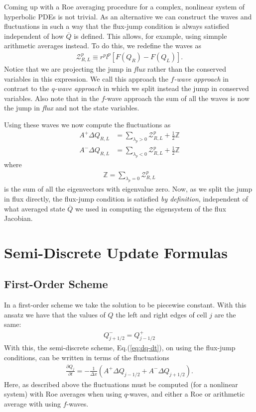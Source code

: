 \documentclass[12pt]{article}
\theoremstyle{definition}
\theoremstyle{definition}
\theoremstyle{definition}
\newcommand{\eqr}[1]{Eq.\thinspace(#1)}
\newcommand{\pfrac}[2]{\frac{\partial #1}{\partial #2}}
\begin{document}
Coming up with a Roe averaging procedure for a complex, nonlinear
system of hyperbolic PDEs is not trivial. As an alternative we can
construct the waves and fluctuations in such a way that the flux-jump
condition is always satisfied independent of how $\overline{Q}$ is
defined. This allows, for example, using simnple arithmetic averages
instead. To do this, we redefine the waves as
\begin{align}
  \mathcal{Z}^p_{R,L} \equiv r^p l^p\left[ F(Q_R) -F(Q_L) \right].
\end{align}
Notice that we are projecting the jump in \emph{flux} rather than the
conserved variables in this expression. We call this approach the
\emph{$f$-wave approach} in contrast to the \emph{$q$-wave approach}
in which we split instead the jump in conserved variables. Also note
that in the $f$-wave approach the sum of all the waves is now the jump
in \emph{flux} and not the state variables.

Using these waves we now compute the fluctuations as
\begin{align}
  A^+\Delta Q_{R,L} &= \sum_{\lambda_p>0} \mathcal{Z}_{R,L}^p + \frac{1}{2} \mathbb{Z} \\
  A^-\Delta Q_{R,L} &= \sum_{\lambda_p<0} \mathcal{Z}_{R,L}^p + \frac{1}{2} \mathbb{Z}
\end{align}
where
\begin{align}
  \mathbb{Z} = \sum_{\lambda_p = 0} \mathcal{Z}^p_{R,L}
\end{align}
is the sum of all the eigenvectors with eigenvalue zero. Now, as we
split the jump in flux directly, the flux-jump condition is satisfied
\emph{by definition}, independent of what averaged state
$\overline{Q}$ we used in computing the eigensystem of the flux
Jacobian.

\section{Semi-Discrete Update Formulas}

\subsection{First-Order Scheme}

In a first-order scheme we take the solution to be piecewise
constant. With this ansatz we have that the values of $Q$ the left and
right edges of cell $j$ are the same:
\begin{align}
  Q_{j+1/2}^- = Q_{j-1/2}^+
\end{align}
With this, the semi-discrete scheme, \eqr{\ref{eq:dq-dt}}, on using
the flux-jump conditions, can be written in terms of the fluctuations
\begin{align}
  \pfrac{Q_j}{t} = -\frac{1}{\Delta x}\left( A^+\Delta Q_{j-1/2} + A^-\Delta Q_{j+1/2} \right).
  \label{eq:first-order}
\end{align}
Here, as described above the fluctuations must be computed (for a
nonlinear system) with Roe averages when using $q$-waves, and either a
Roe or arithmetic average with using $f$-waves.
\end{document}
